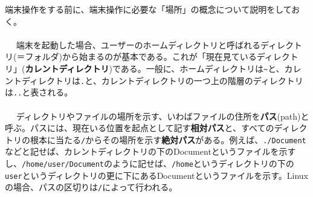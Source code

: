 端末操作をする前に、端末操作に必要な「場所」の概念について説明をしておく。
\\ \\　
端末を起動した場合、ユーザーのホームディレクトリと呼ばれるディレクトリ(＝フォルダ)から始まるのが基本である。これが「現在見ているディレクトリ」(\textbf{カレントディレクトリ})である。一般に、ホームディレクトリは\verb|~|と、カレントディレクトリは\verb|.|と、カレントディレクトリの一つ上の階層のディレクトリは\verb|..|と表される。
\\ \\　
ディレクトリやファイルの場所を示す、いわばファイルの住所を\textbf{パス}(path)と呼ぶ。パスには、現在いる位置を起点として記す\textbf{相対パス}と、すべてのディレクトリの根本に当たる\verb|/|からその場所を示す\textbf{絶対パス}がある。例えば、\verb|./Document|などと記せば、カレントディレクトリの下のDocumentというファイルを示すし、\verb|/home/user/Document|のように記せば、\verb|/home|というディレクトリの下の\verb|user|というディレクトリの更に下にあるDocumentというファイルを示す。Linuxの場合、パスの区切りは\verb|/|によって行われる。

